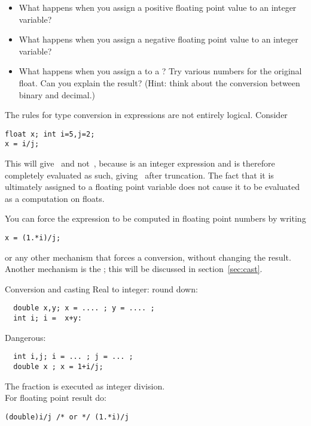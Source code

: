 \begin{exercise}
  \label{ex:float-convert}
  \begin{itemize}
  \item What happens when you assign a positive floating
    point value to an integer variable?
  \item What happens when you assign a negative floating
    point value to an integer variable?
  \item What happens when you assign a  to a ? 
    Try various numbers for the original float. Can you explain the
    result?
    (Hint: think about the conversion between binary and decimal.)
  \end{itemize}
\end{exercise}

The rules for type conversion in expressions are not entirely
logical. Consider
\begin{lstlisting}
float x; int i=5,j=2;
x = i/j;
\end{lstlisting}
This will give~ and not~, because  is an integer
expression and is therefore completely evaluated as such, giving~
after truncation. The fact
that it is ultimately assigned to a floating point variable does not
cause it to be evaluated as a computation on floats.

You can force the expression to be computed in floating point numbers
by writing
\begin{lstlisting}
x = (1.*i)/j;
\end{lstlisting}
or any other mechanism that forces a conversion, without changing the
result.  Another mechanism is the ; this will be
discussed in section~\ref{sec:cast}.

\begin{slide}{Conversion and casting}
  \label{sl:convert-cast}
  Real to integer: round down:
\begin{lstlisting}
  double x,y; x = .... ; y = .... ;
  int i; i =  x+y:
\end{lstlisting}
Dangerous:
\begin{lstlisting}
  int i,j; i = ... ; j = ... ; 
  double x ; x = 1+i/j;
\end{lstlisting}
The fraction is executed as integer division.\\
For floating point result do:
\begin{lstlisting}
(double)i/j /* or */ (1.*i)/j
\end{lstlisting}
\end{slide}

